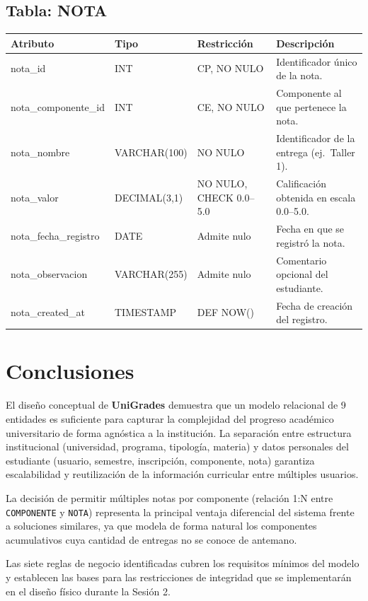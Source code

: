 \documentclass[12pt, letterpaper, twoside]{article}
\begin{document}
\subsection{Tabla: NOTA}

\begin{center}
\begin{tabular}{p{4.2cm} p{2.8cm} p{2.8cm} p{3.8cm}}
\toprule
\textbf{Atributo} & \textbf{Tipo} & \textbf{Restricción} & \textbf{Descripción} \\
\midrule
nota\_id              & INT          & CP, NO NULO              & Identificador único de la nota. \\
nota\_componente\_id  & INT          & CE, NO NULO              & Componente al que pertenece la nota. \\
nota\_nombre          & VARCHAR(100) & NO NULO                  & Identificador de la entrega (ej.\ Taller 1). \\
nota\_valor           & DECIMAL(3,1) & NO NULO, CHECK 0.0--5.0  & Calificación obtenida en escala 0.0--5.0. \\
nota\_fecha\_registro & DATE         & Admite nulo              & Fecha en que se registró la nota. \\
nota\_observacion     & VARCHAR(255) & Admite nulo              & Comentario opcional del estudiante. \\
nota\_created\_at     & TIMESTAMP    & DEF NOW()                & Fecha de creación del registro. \\
\bottomrule
\end{tabular}
\end{center}

\section{Conclusiones}
\label{sec:conc}

El diseño conceptual de \textbf{UniGrades} demuestra que un modelo relacional de
9 entidades es suficiente para capturar la complejidad del progreso académico
universitario de forma agnóstica a la institución. La separación entre estructura
institucional (universidad, programa, tipología, materia) y datos personales del
estudiante (usuario, semestre, inscripción, componente, nota) garantiza escalabilidad
y reutilización de la información curricular entre múltiples usuarios.

La decisión de permitir múltiples notas por componente (relación 1:N entre
\texttt{COMPONENTE} y \texttt{NOTA}) representa la principal ventaja diferencial
del sistema frente a soluciones similares, ya que modela de forma natural los
componentes acumulativos cuya cantidad de entregas no se conoce de antemano.

Las siete reglas de negocio identificadas cubren los requisitos mínimos del modelo
y establecen las bases para las restricciones de integridad que se implementarán en
el diseño físico durante la Sesión 2.
\end{document}
